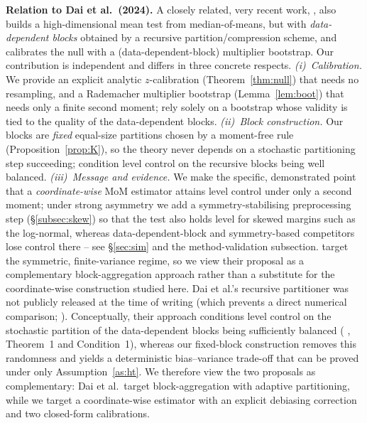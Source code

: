 \documentclass[pdflatex,sn-mathphys-num]{sn-jnl}
\theoremstyle{thmstyleone}%
\theoremstyle{thmstyletwo}%
\theoremstyle{thmstylethree}%
\begin{document}
\textbf{Relation to Dai et al.\ (2024).}
A closely related, very recent work, \citeauthor{dai2024} \citep{dai2024}, also builds a
high-dimensional mean test from median-of-means, but with \emph{data-dependent
blocks} obtained by a recursive partition/compression scheme, and calibrates the
null with a (data-dependent-block) multiplier bootstrap. Our contribution is
independent and differs in three concrete respects. \emph{(i)~Calibration.} We
provide an explicit analytic $z$-calibration (Theorem~\ref{thm:null}) that needs
no resampling, and a Rademacher multiplier bootstrap (Lemma~\ref{lem:boot}) that
needs only a finite second moment; \citeauthor{dai2024} \citep{dai2024} rely solely on a bootstrap
whose validity is tied to the quality of the data-dependent blocks.
\emph{(ii)~Block construction.} Our blocks are \emph{fixed} equal-size partitions
chosen by a moment-free rule (Proposition~\ref{prop:K}), so the theory never
depends on a stochastic partitioning step succeeding; \citeauthor{dai2024} \citep{dai2024} condition
level control on the recursive blocks being well balanced. \emph{(iii)~Message
and evidence.} We make the specific, demonstrated point that a \emph{coordinate-wise}
MoM estimator attains level control under only a second moment; under strong
asymmetry we add a symmetry-stabilising preprocessing step
(\S\ref{subsec:skew}) so that the test also holds level for skewed margins such
as the log-normal, whereas data-dependent-block and symmetry-based competitors
lose control there -- see \S\ref{sec:sim} and the method-validation subsection.
\citeauthor{dai2024} \citep{dai2024} target the symmetric, finite-variance regime, so we view
their proposal as a complementary block-aggregation approach rather than a
substitute for the coordinate-wise construction studied here. Dai et al.'s recursive partitioner was not publicly released at the time
of writing (which prevents a direct numerical comparison;
\citeauthor{dai2024} \citep{dai2024}). Conceptually, their approach conditions
level control on the stochastic partition of the data-dependent blocks being
sufficiently balanced (\citeauthor{dai2024} \citep{dai2024}, Theorem~1 and
Condition~1), whereas our fixed-block construction removes this randomness and
yields a deterministic bias--variance trade-off that can be proved under only
Assumption~\ref{as:ht}. We therefore view the two proposals as
complementary: Dai et al.\ target block-aggregation with adaptive partitioning,
while we target a coordinate-wise estimator with an explicit debiasing
correction and two closed-form calibrations.
\end{document}
